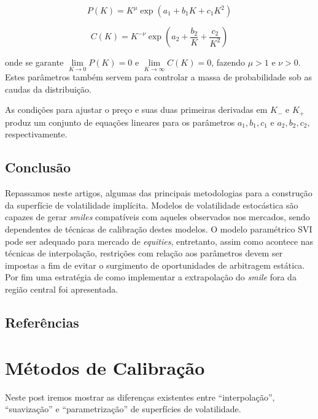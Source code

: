 \documentclass[]{book}
\theoremstyle{definition}
\theoremstyle{definition}
\theoremstyle{definition}
\theoremstyle{remark}
\begin{document}
\begin{equation}
P(K)=K^\mu \exp\left(a_1+b_1K+c_1K^2\right)
\label{eq:pk}
\end{equation}

\begin{equation}
C(K)=K^{-\nu} \exp\left(a_2+\frac{b_2}{K}+\frac{c_2}{K^2}\right)
\label{eq:ck}
\end{equation}

onde se garante \(\lim\limits_{K\rightarrow 0} P(K)=0\) e
\(\lim\limits_{K\rightarrow \infty} C(K)=0\), fazendo \(\mu > 1\) e
\(\nu > 0\). Estes parâmetros também servem para controlar a massa de
probabilidade sob as caudas da distribuição.

As condições para ajustar o preço e suas duas primeiras derivadas em
\(K_-\) e \(K_+\) produz um conjunto de equações lineares para os
parâmetros \(a_1, b_1, c_1\) e \(a_2, b_2, c_2\), respectivamente.

\section{Conclusão}\label{conclusao-1}

Repassamos neste artigos, algumas das principais metodologias para a
construção da superfície de volatilidade implícita. Modelos de
volatilidade estocástica são capazes de gerar \emph{smiles} compatíveis
com aqueles observados nos mercados, sendo dependentes de técnicas de
calibração destes modelos. O modelo paramétrico SVI pode ser adequado
para mercado de \emph{equities}, entretanto, assim como acontece nas
técnicas de interpolação, restrições com relação aos parâmetros devem
ser impostas a fim de evitar o surgimento de oportunidades de arbitragem
estática. Por fim uma estratégia de como implementar a extrapolação do
\emph{smile} fora da região central foi apresentada.

\section{Referências}\label{referencias}

\hypertarget{calibracao}{\chapter{Métodos de
Calibração}\label{calibracao}}

Neste post iremos mostrar as diferenças existentes entre
``interpolação'', ``suavização'' e ``parametrização'' de superfícies de
volatilidade.
\end{document}
